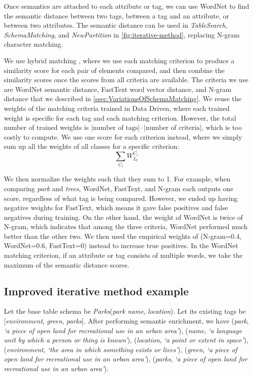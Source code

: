 Once semantics are attached to each attribute or tag, we can use WordNet to find the semantic distance between two tags, between a tag and an attribute, or between two attributes. The semantic distance can be used in \textit{TableSearch}, \textit{SchemaMatching}, and \textit{NewPartition} in \autoref{fig:iterative-method}, replacing N-gram character matching.

We use hybrid matching \cite{Rahm2001Survey}, where we use each matching criterion to produce a similarity score for each pair of elements compared, and then combine the similarity scores once the scores from all criteria are available. The criteria we use are WordNet semantic distance, FastText word vector distance, and N-gram distance that we described in \autoref{ssec:VariationsOfSchemaMatching}. We reuse the weights of the matching criteria trained in Data Driven, where each trained weight is specific for each tag and each matching criterion. However, the total number of trained weights is $\left|\text{number of tags}\right|\cdot\left|\text{number of criteria}\right|$, which is too costly to compute. We use one score for each criterion instead, where we simply sum up all the weights of all classes for a specific criterion:
\[
\sum_{C_{i}}\ensuremath{W}_{L_{t}}^{C_{i}}
\]

We then normalize the weights such that they sum to 1. For example, when comparing \textit{park} and \textit{trees}, WordNet, FastText, and N-gram each outputs one score, regardless of what tag is being compared. However, we ended up having negative weights for FastText, which means it gave false positives and false negatives during training. On the other hand, the weight of WordNet is twice of N-gram, which indicates that among the three criteria, WordNet performed much better than the other two. We then used the empirical weights of (N-gram=0.4, WordNet=0.6, FastText=0) instead to increase true positives. In the WordNet matching criterion, if an attribute or tag consists of multiple words, we take the maximum of the semantic distance scores.

\subsection{Improved iterative method example}
\label{ssec:ImprovedIterativeMethodExample}

Let the base table schema be \textit{Parks}(\textit{park name}, \textit{location}). Let its existing tags be [\textit{environment}, \textit{green}, \textit{parks}]. After performing semantic enrichment, we have (\textit{park}, \textit{`a piece of open land for recreational use in an urban area'}), (\textit{name}, \textit{`a language unit by which a person or thing is known'}), (\textit{location}, \textit{`a point or extent in space'}), (\textit{environment}, \textit{`the area in which something exists or lives'}), (\textit{green}, \textit{`a piece of open land for recreational use in an urban area'}), (\textit{parks}, \textit{`a piece of open land for recreational use in an urban area'}).

